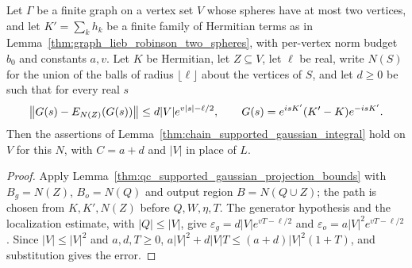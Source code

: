 \begin{lemma}
    \label{lem:graph_supported_gaussian_integral}
    \leanok
    Let $\Gamma$ be a finite graph on a vertex set $V$ whose spheres have at
    most two vertices, and let $K'=\sum_k h_k$ be a finite family of
    Hermitian terms as in Lemma~\ref{thm:graph_lieb_robinson_two_spheres},
    with per-vertex norm budget $b_0$ and constants $a,v$. Let $K$ be
    Hermitian, let $Z\subseteq V$, let $\ell$ be real, write $N(S)$ for the
    union of the balls of radius $\lfloor\ell\rfloor$ about the vertices of
    $S$, and let $d\ge0$ be such that for every real $s$
    \begin{align}
        \bigl\|G(s)-E_{N(Z)}(G(s))\bigr\|\le d|V|e^{v|s|-\ell/2},\qquad
        G(s)=e^{isK'}(K'-K)e^{-isK'}.\notag
    \end{align}
    Then the assertions of
    Lemma~\ref{thm:chain_supported_gaussian_integral} hold on $V$ for this
    $N$, with $C=a+d$ and $|V|$ in place of $L$.
\end{lemma}
\begin{proof}\leanok
    Apply Lemma~\ref{thm:qc_supported_gaussian_projection_bounds} with
    $B_g=N(Z)$, $B_o=N(Q)$ and output region $B=N(Q\cup Z)$; the path is
    chosen from $K,K',N(Z)$ before $Q,W,\eta,T$. The generator hypothesis
    and the localization estimate, with $|Q|\le|V|$, give
    $\varepsilon_g=d|V|e^{vT-\ell/2}$ and $\varepsilon_o=a|V|^2e^{vT-\ell/2}$.
    Since $|V|\le|V|^2$ and $a,d,T\ge0$,
    $a|V|^2+d|V|T\le(a+d)|V|^2(1+T)$, and substitution gives the error.
\end{proof}

